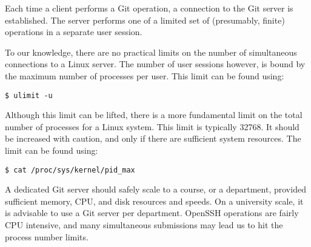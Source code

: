 Each time a client performs a Git operation, a connection to the Git server is
established. The server performs one of a limited set of (presumably, finite)
operations in a separate user session.

To our knowledge, there are no practical limits on the number of simultaneous
connections to a Linux server. The number of user sessions however, is bound by
the maximum number of processes per user. This limit can be found using:

\begin{lstlisting}
$ ulimit -u
\end{lstlisting}

Although this limit can be lifted, there is a more fundamental limit on the
total number of processes for a Linux system. This limit is typically 32768. It
should be increased with caution, and only if there are sufficient system
resources. The limit can be found using:

\begin{lstlisting}
$ cat /proc/sys/kernel/pid_max
\end{lstlisting}

A dedicated Git server should safely scale to a course, or a department,
provided sufficient memory, CPU, and disk resources and speeds. On a university
scale, it is advisable to use a Git server per department. OpenSSH operations
are fairly CPU intensive, and many simultaneous submissions may lead us to hit
the process number limits.
